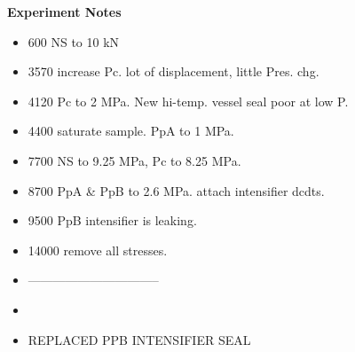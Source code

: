 \documentclass[letterpaper, 10pt]{article}
\begin{document}
\newpage 
 \textbf{Experiment Notes}
 \medskip
 {\small \begin{itemize}[label=\#]
 \setlength\itemsep{0.25em}
 	 \item 600 NS to 10 kN
 	 \item 3570 increase Pc. lot of displacement, little Pres. chg. 
 	 \item 4120 Pc to 2 MPa. New hi-temp. vessel seal poor at low P. 
 	 \item 4400 saturate sample. PpA to 1 MPa. 
 	 \item 7700 NS to 9.25 MPa, Pc to 8.25 MPa.
 	 \item 8700 PpA \& PpB to 2.6 MPa. attach intensifier dcdts. 
 	 \item 9500 PpB intensifier is leaking.
 	 \item 14000 remove all stresses.
 	 \item --------------------------------
 	 \item 
 	 \item 
REPLACED PPB INTENSIFIER SEAL
 \end{itemize}} 

 
\end{document}
